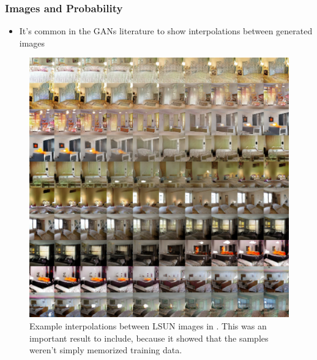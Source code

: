 \documentclass[10pt,mathserif]{beamer}
\begin{document}
\begin{frame}
  \frametitle{Images and Probability}
\begin{itemize}
\item It's common in the GANs literature to show interpolations between
  generated images
\end{itemize}
\begin{figure}[ht]
  \centering
  \includegraphics[width=0.35\paperwidth]{figure/gan_image_interpolations}
  \caption{Example interpolations between LSUN images in
    \citep{radford2015unsupervised}. This was an important result to include,
    because it showed that the samples weren't simply memorized training
    data. \label{fig:gan_interpolations} }
\end{figure}
\end{frame}
\end{document}
